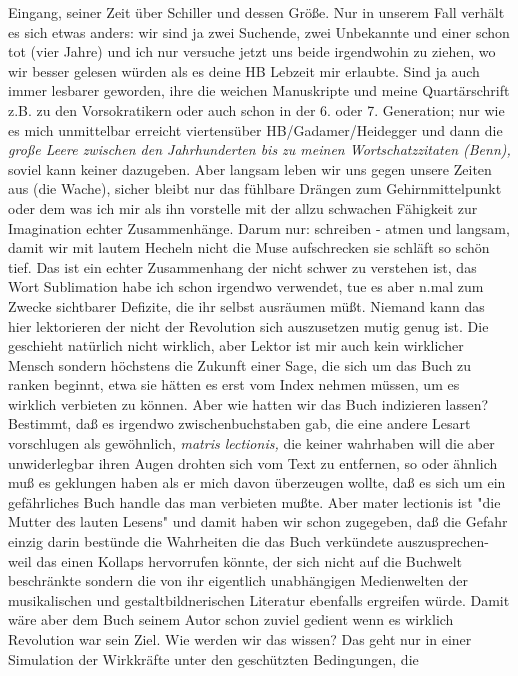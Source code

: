 \documentclass[
]{article}
\begin{document}
Eingang, seiner Zeit über Schiller und dessen Größe. Nur in unserem Fall
verhält es sich etwas anders: wir sind ja zwei Suchende, zwei Unbekannte
und einer schon tot (vier Jahre) und ich nur versuche jetzt uns beide
irgendwohin zu ziehen, wo wir besser gelesen würden als es deine HB
Lebzeit mir erlaubte. Sind ja auch immer lesbarer geworden, ihre die
weichen Manuskripte und meine Quartärschrift z.B. zu den Vorsokratikern
oder auch schon in der 6. oder 7. Generation; nur wie es mich
unmittelbar erreicht viertensüber HB/Gadamer/Heidegger und dann die
\emph{große Leere zwischen den Jahrhunderten bis zu meinen
Wortschatzzitaten (Benn), }soviel kann keiner dazugeben. Aber langsam
leben wir uns gegen unsere Zeiten aus (die Wache), sicher bleibt nur das
fühlbare Drängen zum Gehirnmittelpunkt oder dem was ich mir als ihn
vorstelle mit der allzu schwachen Fähigkeit zur Imagination echter
Zusammenhänge. Darum nur: schreiben - atmen und langsam, damit wir mit
lautem Hecheln nicht die Muse aufschrecken sie schläft so schön tief.
Das ist ein echter Zusammenhang der nicht schwer zu verstehen ist, das
Wort Sublimation habe ich schon irgendwo verwendet, tue es aber n.mal
zum Zwecke sichtbarer Defizite, die ihr selbst ausräumen müßt. Niemand
kann das hier lektorieren der nicht der Revolution sich auszusetzen
mutig genug ist. Die geschieht natürlich nicht wirklich, aber Lektor ist
mir auch kein wirklicher Mensch sondern höchstens die Zukunft einer
Sage, die sich um das Buch zu ranken beginnt, etwa sie hätten es erst
vom Index nehmen müssen, um es wirklich verbieten zu können. Aber wie
hatten wir das Buch indizieren lassen? Bestimmt, daß es irgendwo
zwischenbuchstaben gab, die eine andere Lesart vorschlugen als
gewöhnlich, \emph{matris lectionis,} die keiner wahrhaben will die aber
unwiderlegbar ihren Augen drohten sich vom Text zu entfernen, so oder
ähnlich muß es geklungen haben als er mich davon überzeugen wollte, daß
es sich um ein gefährliches Buch handle das man verbieten mußte. Aber
mater lectionis ist "die Mutter des lauten Lesens" und damit haben wir
schon zugegeben, daß die Gefahr einzig darin bestünde die Wahrheiten die
das Buch verkündete auszusprechen- weil das einen Kollaps hervorrufen
könnte, der sich nicht auf die Buchwelt beschränkte sondern die von ihr
eigentlich unabhängigen Medienwelten der musikalischen und
gestaltbildnerischen Literatur ebenfalls ergreifen würde. Damit wäre
aber dem Buch seinem Autor schon zuviel gedient wenn es wirklich
Revolution war sein Ziel. Wie werden wir das wissen? Das geht nur in
einer Simulation der Wirkkräfte unter den geschützten Bedingungen, die
\end{document}
